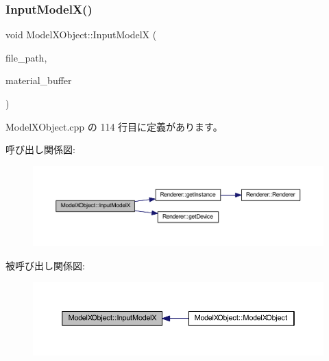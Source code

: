 \subsubsection{\texorpdfstring{Input\+Model\+X()}{InputModelX()}}
{\footnotesize\ttfamily void Model\+X\+Object\+::\+Input\+ModelX (\begin{DoxyParamCaption}\item[{const std\+::string $\ast$}]{file\+\_\+path,  }\item[{L\+P\+D3\+D\+X\+B\+U\+F\+F\+ER $\ast$}]{material\+\_\+buffer }\end{DoxyParamCaption})\hspace{0.3cm}{\ttfamily [private]}}



 Model\+X\+Object.\+cpp の 114 行目に定義があります。

呼び出し関係図\+:
\nopagebreak
\begin{figure}[H]
\begin{center}
\leavevmode
\includegraphics[width=350pt]{class_model_x_object_ac7a86f4d034600ae5d8f8fd3610f4628_cgraph}
\end{center}
\end{figure}
被呼び出し関係図\+:\nopagebreak
\begin{figure}[H]
\begin{center}
\leavevmode
\includegraphics[width=350pt]{class_model_x_object_ac7a86f4d034600ae5d8f8fd3610f4628_icgraph}
\end{center}
\end{figure}
\mbox{\label{class_model_x_object_a83995ec817bccb4584d635b2005578a8}} 
